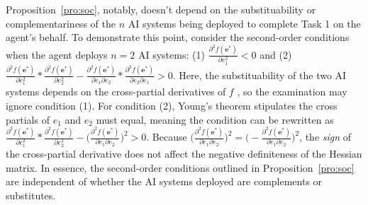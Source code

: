 \documentclass[11pt]{article}
\theoremstyle{definition}
\theoremstyle{remark}
\begin{document}
Proposition~\ref{pro:soc}, notably, doesn't depend on the substituability or complementariness of the $n$ AI systems being deployed to complete Task 1 on the agent's behalf. To demonstrate this point, consider the second-order conditions when the agent deploys $n=2$ AI systems: (1) $\frac{\partial^2 f(\mathbf{e}^*)}{\partial e_1^2}<0$ and (2) $\frac{\partial^2 f(\mathbf{e}^*)}{\partial e_1^2}*\frac{\partial^2 f(\mathbf{e}^*)}{\partial e_2^2}-\frac{\partial^2 f(\mathbf{e}^*)}{\partial e_1\partial e_2}*\frac{\partial^2 f(\mathbf{e}^*)}{\partial e_2\partial e_1}>0$. Here, the substituability of the two AI systems depends on the cross-partial derivatives of $f$ \citep{RePEc:oxp:obooks:9780195102680}, so the examination may ignore condition (1). For condition (2), Young's theorem stipulates the cross partials of $e_1$ and $e_2$ must equal, meaning the condition can be rewritten as $\frac{\partial^2 f(\mathbf{e}^*)}{\partial e_1^2}*\frac{\partial^2 f(\mathbf{e}^*)}{\partial e_2^2}-\bigg(\frac{\partial^2 f(\mathbf{e}^*)}{\partial e_1\partial e_2}\bigg)^2>0$. Because $\bigg(\frac{\partial^2 f(\mathbf{e}^*)}{\partial e_1\partial e_2}\bigg)^2=\bigg(-\frac{\partial^2 f(\mathbf{e}^*)}{\partial e_1\partial e_2}\bigg)^2$, the \textit{sign} of the cross-partial derivative does not affect the negative definiteness of the Hessian matrix. In essence, the second-order conditions outlined in Proposition~\ref{pro:soc} are independent of whether the AI systems deployed are complements or substitutes.
\end{document}
